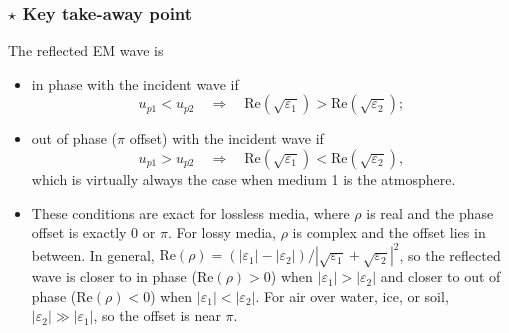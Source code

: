 \documentclass[11pt, oneside]{article}
\begin{document}
\subsubsection{$\star$ Key take-away point}

The reflected EM wave is
\begin{itemize}
	\item in phase with the incident wave if
	\begin{equation}
		u_{p1} < u_{p2} \quad\Rightarrow\quad \mathrm{Re}\left(\sqrt{\varepsilon_1}\right) > \mathrm{Re}\left(\sqrt{\varepsilon_2}\right);
	\end{equation}
	\item out of phase ($\pi$ offset) with the incident wave if
	\begin{equation}
		u_{p1} > u_{p2} \quad\Rightarrow\quad \mathrm{Re}\left(\sqrt{\varepsilon_1}\right) < \mathrm{Re}\left(\sqrt{\varepsilon_2}\right),
	\end{equation}
	which is virtually always the case when medium 1 is the atmosphere.
	\item These conditions are exact for lossless media, where $\rho$ is real and the phase offset is exactly 0 or $\pi$. For lossy media, $\rho$ is complex and the offset lies in between. In general, $\mathrm{Re}(\rho) = (|\varepsilon_1| - |\varepsilon_2|)/|\sqrt{\varepsilon_1} + \sqrt{\varepsilon_2}|^2$, so the reflected wave is closer to in phase ($\mathrm{Re}(\rho) > 0$) when $|\varepsilon_1| > |\varepsilon_2|$ and closer to out of phase ($\mathrm{Re}(\rho) < 0$) when $|\varepsilon_1| < |\varepsilon_2|$. For air over water, ice, or soil, $|\varepsilon_2| \gg |\varepsilon_1|$, so the offset is near $\pi$.
\end{itemize}
\end{document}
